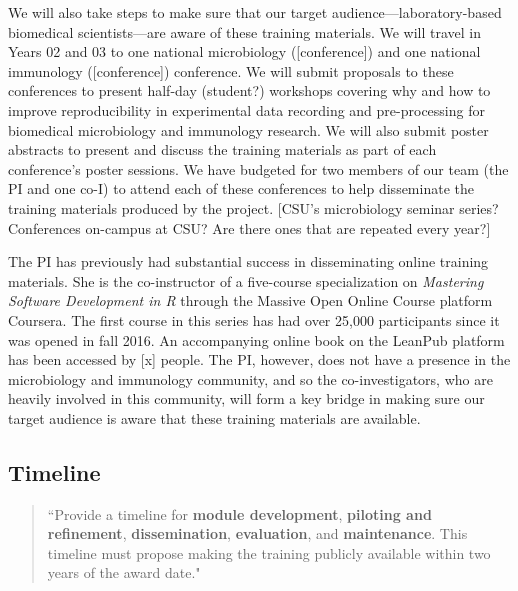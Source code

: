 \documentclass[pdftex,english,11pt,parskip=half]{scrartcl}
\begin{document}
We will also take steps to make sure that our target audience---laboratory-based biomedical scientists---are aware of these training materials. We will travel in Years 02 and 03 to one national microbiology ([conference]) and one national immunology ([conference]) conference. We will submit proposals to these conferences to present half-day (student?) workshops covering why and how to improve reproducibility in experimental data recording and pre-processing for biomedical microbiology and immunology research. We will also submit poster abstracts to present and discuss the training materials as part of each conference's poster sessions. We have budgeted for two members of our team (the PI and one co-I) to attend each of these conferences to help disseminate the training materials produced by the project. [CSU's microbiology seminar series? Conferences on-campus at CSU? Are there ones that are repeated every year?]

The PI has previously had substantial success in disseminating online training materials. She is the co-instructor of a five-course specialization on \textit{Mastering Software Development in R} through the Massive Open Online Course platform Coursera. The first course in this series has had over 25,000 participants since it was opened in fall 2016. An accompanying online book on the LeanPub platform has been accessed by [x] people. The PI, however, does not have a presence in the microbiology and immunology community, and so the co-investigators, who are heavily involved in this community, will form a key bridge in making sure our target audience is aware that these training materials are available.
    
\subsection{Timeline}

\begin{quotation}
``Provide a timeline for \textbf{module development}, \textbf{piloting and refinement}, \textbf{dissemination}, \textbf{evaluation}, and \textbf{maintenance}.  This timeline must propose making the training publicly available within two years of the award date."
\end{quotation}
\end{document}
